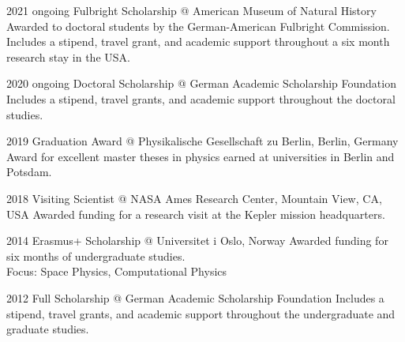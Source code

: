 \documentclass[]{k-cv} %
\begin{document}
\begin{entrylist}
\entry
{2021 \to ongoing}
{Fulbright Scholarship @ American Museum of Natural History}
{ }
{Awarded to doctoral students by the German-American Fulbright Commission.  Includes a stipend, travel grant, and academic support throughout a  six month research stay in the USA.}

\entry
{2020 \to ongoing}
{Doctoral Scholarship @ German Academic Scholarship Foundation}
{}
{Includes a stipend, travel grants, and academic support throughout the doctoral studies.}

\entry
{2019}
{Graduation Award @ Physikalische Gesellschaft zu Berlin, Berlin, Germany}
{}
{Award for excellent master theses in physics earned at universities in Berlin and Potsdam.}


\entry
{2018}
{Visiting Scientist @ NASA Ames Research Center, Mountain View, CA, USA}
{}
{Awarded funding for a research visit at the Kepler mission headquarters.}


\entry
{2014}
{Erasmus+ Scholarship @ Universitet i Oslo, Norway}
{}
{Awarded funding for six months of undergraduate studies.\\
Focus: Space Physics, Computational Physics}

\entry
{2012 }
{Full Scholarship @ German Academic Scholarship Foundation}
{}
{Includes a stipend, travel grants, and academic support throughout the undergraduate and graduate studies.}

\end{entrylist}


\end{document}

